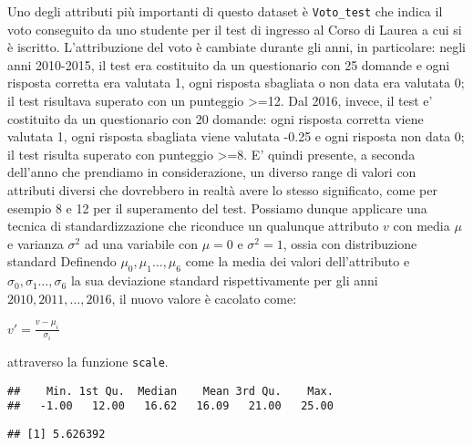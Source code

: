 \documentclass[
]{article}
\newenvironment{Shaded}{\begin{snugshade}}{\end{snugshade}}
\newcommand{\KeywordTok}[1]{\textcolor[rgb]{0.13,0.29,0.53}{\textbf{#1}}}
\newcommand{\NormalTok}[1]{#1}
\newcommand{\OperatorTok}[1]{\textcolor[rgb]{0.81,0.36,0.00}{\textbf{#1}}}
\begin{document}
Uno degli attributi più importanti di questo dataset è
\texttt{Voto\_test} che indica il voto conseguito da uno studente per il
test di ingresso al Corso di Laurea a cui si è iscritto. L'attribuzione
del voto è cambiate durante gli anni, in particolare: negli anni
2010-2015, il test era costituito da un questionario con 25 domande e
ogni risposta corretta era valutata 1, ogni risposta sbagliata o non
data era valutata 0; il test risultava superato con un punteggio
\textgreater=12. Dal 2016, invece, il test e' costituito da un
questionario con 20 domande: ogni risposta corretta viene valutata 1,
ogni risposta sbagliata viene valutata -0.25 e ogni risposta non data 0;
il test risulta superato con punteggio \textgreater=8. E' quindi
presente, a seconda dell'anno che prendiamo in considerazione, un
diverso range di valori con attributi diversi che dovrebbero in realtà
avere lo stesso significato, come per esempio 8 e 12 per il superamento
del test. Possiamo dunque applicare una tecnica di standardizzazione che
riconduce un qualunque attributo \(v\) con media \(\mu\) e varianza
\(\sigma^2\) ad una variabile con \(\mu=0\) e \(\sigma^2=1\), ossia con
distribuzione standard Definendo \(\mu_0,\mu_1\dots,\mu_6\) come la
media dei valori dell'attributo e \(\sigma_0,\sigma_1\dots,\sigma_6\) la
sua deviazione standard rispettivamente per gli anni
\(2010, 2011, \dots, 2016\), il nuovo valore è cacolato come:

\(v'=\frac{v-\mu_i}{\sigma_i}\)

attraverso la funzione \texttt{scale}.

\begin{Shaded}
\end{Shaded}

\begin{verbatim}
##    Min. 1st Qu.  Median    Mean 3rd Qu.    Max. 
##   -1.00   12.00   16.62   16.09   21.00   25.00
\end{verbatim}

\begin{Shaded}
\end{Shaded}

\begin{verbatim}
## [1] 5.626392
\end{verbatim}
\end{document}
